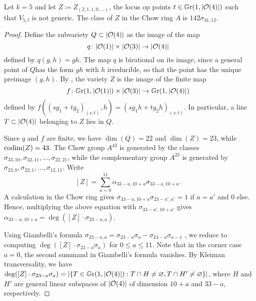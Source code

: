 \begin{proposition}
	Let $k=5$ and let $Z \coloneqq Z_{(2,1,1,0,\dotsc)}$, \ie the locus op points $t\in \mathbb G \mathrm r(1,\lvert\mathcal{O}(4)\rvert)$ such that $V_{5,t}$ is not generic. The class of $Z$ in the Chow ring $A$ is $142 \sigma_{31,12}$.
\end{proposition}

\begin{proof}
	Define the subvariety $Q \subset \lvert\mathcal{O}(4)\rvert$ as the image of the map $$q\colon \lvert\mathcal{O}(1)\rvert \times \lvert\mathcal{O}(3)\rvert \to \lvert\mathcal{O}(4)\rvert$$ defined by $q(g,h) = gh$. The map $q$ is birational on its image, since a general point of $Q$has the form $gh$ with $h$ irreducible, so that the point has the unique preimage $(g,h)$. By , the variety $Z$ is the image of the finite map
	$$f\colon \mathbb G \mathrm r(1,\lvert\mathcal{O}(1)\rvert) \times \lvert\mathcal{O}(3)\rvert \to \mathbb G \mathrm r(1,\lvert\mathcal{O}(4)\rvert)$$
	defined by $f((sg_1 + tg_2)_{(s:t)},h) = (sg_1h+tg_2h)_{(s:t)}$. In particular, a line $T\subset \lvert\mathcal{O}(4)\rvert$ belonging to $Z$ lies in $Q$.

	Since $q$ and $f$ are finite, we have $\dim(Q) = 22$ and $\dim(Z)=23$, while $\operatorname{codim}(Z)=43$. The Chow group $A^{43}$ is generated by the classes $\sigma_{33,10},\sigma_{32,11},\dotsc,\sigma_{22,21}$, while the complementary group $A^{23}$ is generated by
	$\sigma_{23,0},\sigma_{22,1},\dotsc,\sigma_{12,11}$. Write
	\[
		[Z] = \sum_{a=0}^{11} \alpha_{33-a,10+a} \sigma_{33-a,10+a}. 
	\]
	A calculation in the Chow ring gives $\sigma_{33-a,10+a} \sigma_{23-a',a'} = 1$ if $a=a'$ and $0$ else. Hence, multiplying the above equation with $\sigma_{33-a',10+a'}$ gives $\alpha_{33-a,10+a} = \deg([Z]\cdot \sigma_{23-a,a})$.

	Using Giambelli's formula 
	$\sigma_{23-a,a}=\sigma_{23-a}\sigma_{a} - \sigma_{24-a}\sigma_{a-1}$ \cite[Prop.\ 4.16]{eisenbud-harris-intersection-theory}, we reduce to computing $\deg([Z] \cdot \sigma_{23-a}\sigma_{a})$ for $0\leq a\leq 11$.
	Note that in the corner case $a=0$, the second summand in Giambelli's formula vanishes.
	By Kleiman transversality, we have $\deg([Z] \cdot \sigma_{23-a}\sigma_{a}) = \lvert\{T\in \mathbb G \mathrm r(1,\lvert\mathcal{O}(4)\rvert) : T \cap H \neq \varnothing, T \cap H' \neq \varnothing\}\rvert$, where $H$ and $H'$ are general linear subspaces of $\lvert\mathcal{O}(4)\rvert$ of dimension $10+a$ and $33-a$, respectively.


\end{proof}
